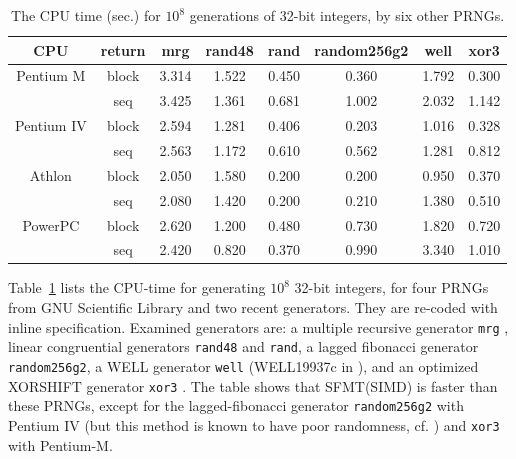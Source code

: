 \documentclass[acmnow]{acmtrans2m}
\begin{document}
\begin{table}
\begin{center}
\begin{tabular}{|c|c||c|c|c|c|c|c|}
\hline
CPU & return & mrg & rand48 & rand & random256g2 & well & xor3  \\ \hline \hline
Pentium M & block & 3.314  & 1.522  & 0.450  & 0.360  & 1.792  & 0.300 \\
\cline{2-8}
 & seq & 3.425  & 1.361  & 0.681  & 1.002  & 2.032  & 1.142 \\ \hline
Pentium IV & block & 2.594  & 1.281  & 0.406  & 0.203  & 1.016  & 0.328 \\ 
\cline{2-8}
 & seq & 2.563  & 1.172  & 0.610  & 0.562  & 1.281  & 0.812 \\ \hline
Athlon & block & 2.050  & 1.580  & 0.200  & 0.200  & 0.950  & 0.370 \\ 
\cline{2-8}
 & seq & 2.080  & 1.420  & 0.200  & 0.210  & 1.380  & 0.510 \\ \hline
PowerPC & block & 2.620  & 1.200  & 0.480  & 0.730  & 1.820  & 0.720 \\ 
\cline{2-8}
 & seq & 2.420  & 0.820  & 0.370  & 0.990  & 3.340  & 1.010 \\ \hline
\end{tabular}
\end{center}
\caption{The CPU time (sec.) for $10^8$ generations of 32-bit integers,
by six other PRNGs.}\label{tab:speed-other}
\end{table}
Table~\ref{tab:speed-other} lists the CPU-time for generating
$10^8$ 32-bit integers, for four PRNGs from GNU Scientific Library
and two recent generators. 
They are re-coded with inline specification. Examined
generators are:
a multiple recursive generator {\tt mrg} \cite{MRG}, 
linear congruential generators {\tt rand48} and {\tt rand}, 
a lagged fibonacci generator {\tt random256g2},
a WELL generator {\tt well} (WELL19937c in \cite{WELL}),
and an optimized XORSHIFT generator {\tt xor3} 
\cite{XORSHIFT} \cite{XORSHIFT-MAR}.
The table shows that SFMT(SIMD) is faster than
these PRNGs, except for the lagged-fibonacci
generator {\tt random256g2} with Pentium IV
(but this method is known to
 have poor randomness, cf. \cite{SUM})
and {\tt xor3} with Pentium-M.
\end{document}
